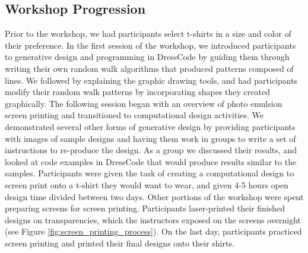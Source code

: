 \documentclass{sigchi}
\begin{document}
\subsection{Workshop Progression}
Prior to the workshop, we had participants select t-shirts in a size and color of their preference. In the first session of the workshop, we introduced participants to generative design and programming in DressCode by guiding them through writing their own random walk algorithms that produced patterns composed of lines. We followed by explaining the graphic drawing tools, and had participants modify their random walk patterns by incorporating shapes they created graphically. The following session began with an overview of photo emulsion screen printing and transitioned to computational design activities. We demonstrated several other forms of generative design by providing participants with images of sample designs and having them work in groups to write a set of instructions to re-produce the design. As a group we discussed their results, and looked at code examples in DressCode that would produce results similar to the samples.  %
Participants were given the task of creating a computational design to screen print onto a t-shirt they would want to wear, and given 4-5 hours open design time divided between two days. Other portions of the workshop were spent preparing screens for screen printing. Participants laser-printed their finished designs on transparencies, which the instructors exposed on the screens overnight (see Figure \ref{fig:screen_printing_process}). On the last day, participants practiced screen printing and printed their final designs onto their shirts.
\end{document}
